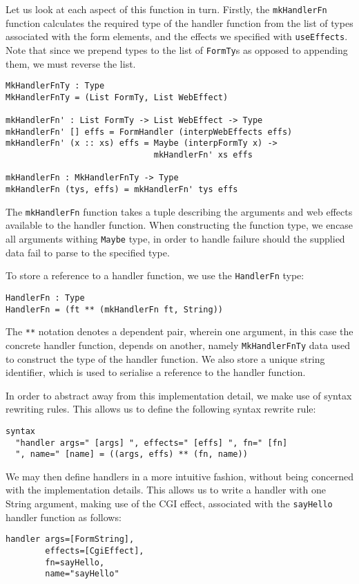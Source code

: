 \documentclass[preprint]{sigplanconf}
\begin{document}
Let us look at each aspect of this function in turn. Firstly, the \texttt{mkHandlerFn} function calculates the required type of the handler function from the list of types associated with the form elements, and the effects we specified with \texttt{useEffects}. Note that since we prepend types to the list of \texttt{FormTy}s as opposed to appending them, we must reverse the list.
\begin{Verbatim}
MkHandlerFnTy : Type
MkHandlerFnTy = (List FormTy, List WebEffect)

mkHandlerFn' : List FormTy -> List WebEffect -> Type
mkHandlerFn' [] effs = FormHandler (interpWebEffects effs) 
mkHandlerFn' (x :: xs) effs = Maybe (interpFormTy x) -> 
                              mkHandlerFn' xs effs 

mkHandlerFn : MkHandlerFnTy -> Type 
mkHandlerFn (tys, effs) = mkHandlerFn' tys effs 
\end{Verbatim}
The \texttt{mkHandlerFn} function takes a tuple describing the arguments and web effects available to the handler function. When constructing the function type, we encase all arguments withing \texttt{Maybe} type, in order to handle failure should the supplied data fail to parse to the specified type.

To store a reference to a handler function, we use the \texttt{HandlerFn} type:
\begin{Verbatim}
HandlerFn : Type
HandlerFn = (ft ** (mkHandlerFn ft, String))
\end{Verbatim}
%
The \texttt{**} notation denotes a dependent pair, wherein one argument, in this case the concrete handler function, depends on another, namely \texttt{MkHandlerFnTy} data used to construct the type of the handler function. We also store a unique string identifier, which is used to serialise a reference to the handler function. 

In order to abstract away from this implementation detail, we make use of \idris{} syntax rewriting rules. This allows us to define the following syntax rewrite rule:
\begin{Verbatim}
syntax 
  "handler args=" [args] ", effects=" [effs] ", fn=" [fn] 
  ", name=" [name] = ((args, effs) ** (fn, name))
\end{Verbatim}
We may then define handlers in a more intuitive fashion, without being concerned with the implementation details. This allows us to write a handler with one String argument, making use of the CGI effect, associated with the \texttt{sayHello} handler function as follows:
\begin{Verbatim}
handler args=[FormString], 
        effects=[CgiEffect], 
        fn=sayHello, 
        name="sayHello"
\end{Verbatim}
\end{document}
